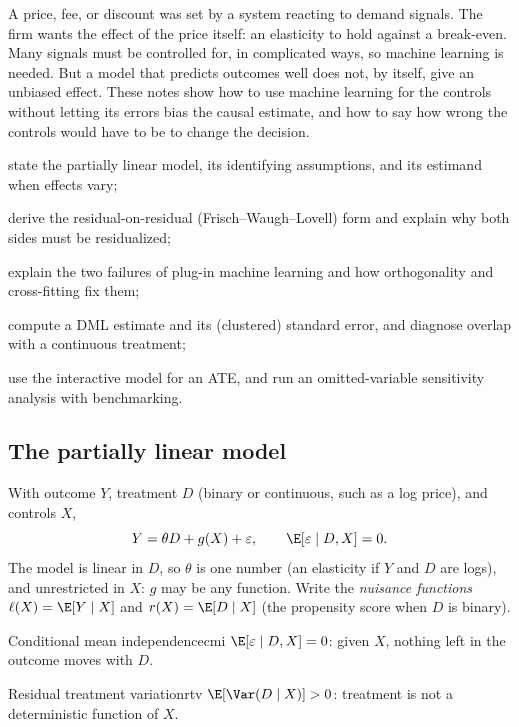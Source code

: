 \documentclass[11pt]{article}
\begin{document}

\begin{decision}
A price, fee, or discount was set by a system reacting to demand signals. The firm wants the effect of the price itself: an
elasticity to hold against a break-even. Many signals must be controlled for, in complicated ways, so machine learning is
needed. But a model that predicts outcomes well does not, by itself, give an unbiased effect. These notes show how to use
machine learning for the controls without letting its errors bias the causal estimate, and how to say how wrong the controls would
have to be to change the decision.
\end{decision}

\begin{goals}
  \item state the partially linear model, its identifying assumptions, and its estimand when effects vary;
  \item derive the residual-on-residual (Frisch--Waugh--Lovell) form and explain why both sides must be residualized;
  \item explain the two failures of plug-in machine learning and how orthogonality and cross-fitting fix them;
  \item compute a DML estimate and its (clustered) standard error, and diagnose overlap with a continuous treatment;
  \item use the interactive model for an ATE, and run an omitted-variable sensitivity analysis with benchmarking.
\end{goals}

\sectionone

\subsection{The partially linear model}

With outcome $Y$, treatment $D$ (binary or continuous, such as a log price), and controls $X$,
\[
  Y = \theta D + g(X) + \varepsilon, \qquad \E[\varepsilon \mid D, X] = 0 .
\]
The model is linear in $D$, so $\theta$ is one number (an elasticity if $Y$ and $D$ are logs), and unrestricted in $X$: $g$ may be
any function. Write the \emph{nuisance functions} $\ell(X) = \E[Y \mid X]$ and $r(X) = \E[D \mid X]$ (the propensity score when $D$ is
binary).

\begin{assum}{Conditional mean independence}{cmi}
$\E[\varepsilon \mid D, X] = 0$: given $X$, nothing left in the outcome moves with $D$.
\end{assum}
\begin{assum}{Residual treatment variation}{rtv}
$\E[\Var(D \mid X)] > 0$: treatment is not a deterministic function of $X$.
\end{assum}
\end{document}
